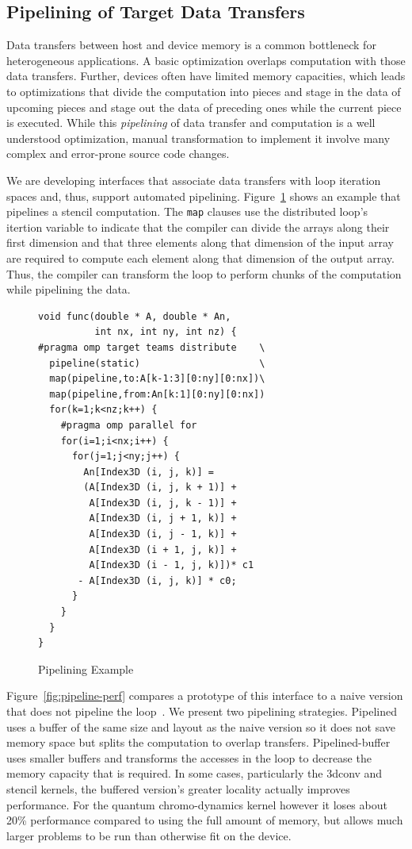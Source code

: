 \subsection{Pipelining of Target Data Transfers}
\label{sub:pipelining}

Data transfers between host and device memory is a common bottleneck 
for heterogeneous applications. A basic optimization overlaps computation
with those data transfers. Further, devices often have limited memory 
capacities, which leads to optimizations that divide the computation
into pieces and stage in the data of upcoming pieces and stage out the
data of preceding ones while the current piece is executed. While this
\emph{pipelining} of data transfer and computation is a well understood
optimization, manual transformation to implement it involve many complex
and error-prone source code changes. 

We are developing interfaces that associate data transfers with loop iteration 
spaces and, thus, support automated pipelining. Figure~\ref{fig:pipeline} shows
an example that pipelines a stencil computation. The \texttt{map} clauses use 
the distributed loop's itertion variable to indicate that the compiler 
can divide the arrays along their first dimension and that three elements 
along that dimension of the input array are required to compute each element 
along that dimension of the output array. Thus, the compiler can transform 
the loop to perform chunks of the computation while pipelining the data.

\begin{figure}
\begin{verbatim}
void func(double * A, double * An,
          int nx, int ny, int nz) {
#pragma omp target teams distribute    \
  pipeline(static)                     \
  map(pipeline,to:A[k-1:3][0:ny][0:nx])\
  map(pipeline,from:An[k:1][0:ny][0:nx])
  for(k=1;k<nz;k++) {
    #pragma omp parallel for
    for(i=1;i<nx;i++) {
      for(j=1;j<ny;j++) {
        An[Index3D (i, j, k)] =
        (A[Index3D (i, j, k + 1)] +
         A[Index3D (i, j, k - 1)] +
         A[Index3D (i, j + 1, k)] +
         A[Index3D (i, j - 1, k)] +
         A[Index3D (i + 1, j, k)] +
         A[Index3D (i - 1, j, k)])* c1
       - A[Index3D (i, j, k)] * c0;
      }
    } 
  }
}
\end{verbatim}
\caption{Pipelining Example\label{fig:pipeline}}
\end{figure}

Figure~\ref{fig:pipeline-perf} compares a prototype of this interface to a 
naive version that does not pipeline the loop~\cite{cui2017directive}. We 
present two pipelining strategies. Pipelined uses a buffer of the same size 
and layout as the naive version so it does not save memory space but splits 
the computation to overlap transfers. Pipelined-buffer uses smaller buffers
and transforms the accesses in the loop to decrease the memory capacity that
is required. In some cases, particularly the 3dconv and stencil kernels, the 
buffered version's greater locality actually improves performance. For the 
quantum chromo-dynamics kernel however it loses about 20\% performance 
compared to using the full amount of memory, but allows much larger 
problems to be run than otherwise fit on the device.

